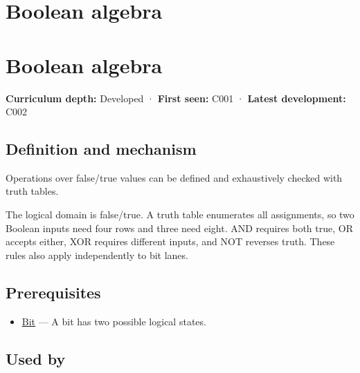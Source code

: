 \hypertarget{appendix-24475e1596a8}{}
\section*{Boolean algebra}
\section{Boolean algebra}\label{boolean-algebra}

\textbf{Curriculum depth:} Developed · \textbf{First seen:} C001 · \textbf{Latest development:} C002

\subsection{Definition and mechanism}\label{definition-and-mechanism}

Operations over false/true values can be defined and exhaustively checked with truth tables.

The logical domain is false/true. A truth table enumerates all assignments, so two Boolean inputs need four rows and three need eight. AND requires both true, OR accepts either, XOR requires different inputs, and NOT reverses truth. These rules also apply independently to bit lanes.

\subsection{Prerequisites}\label{prerequisites}

\begin{itemize}
\tightlist
\item
  \hyperref[appendix-ddbb69998a2e]{Bit} --- A bit has two possible logical states.
\end{itemize}

\subsection{Used by}\label{used-by}

